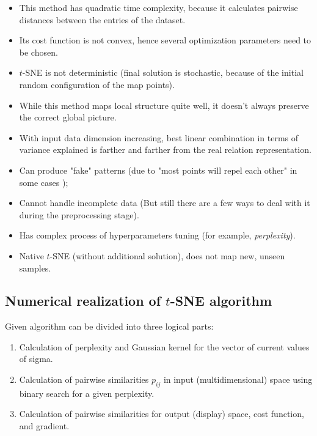 \documentclass[a4paper]{article}
\begin{document}
\begin{itemize}
	\item 
	This method has quadratic time complexity, because it calculates pairwise distances between the entries of the dataset.
	\item
	Its cost function is not convex, hence several optimization parameters need to be chosen.
	\item
	$t$-SNE is not deterministic (final solution is stochastic, because of the initial random configuration of the map points).
	\item 
	While this method maps local structure quite well, it doesn't always preserve the correct global picture.
	\item 
	With input data dimension increasing, best linear combination in terms of variance explained is farther and farther from the real relation representation.
	\item 
	Can produce "fake" patterns (due to "most points will repel each other" in some cases \cite{mathstack});
	\item 
	Cannot handle incomplete data (But still there are a few ways to deal with it during the preprocessing stage).
	\item
	Has complex process of hyperparameters tuning (for example, \textit{perplexity}).
	\item 
	Native $t$-SNE (without additional solution), does not map new, unseen samples.
	
\end{itemize}

\subsection*{Numerical realization of $t$-SNE algorithm}

Given algorithm can be divided into three logical parts:

\begin{enumerate}
	\item 
	Calculation of perplexity and Gaussian kernel for the vector of current values of sigma.
	\item  
	Calculation of pairwise similarities $p_{ij}$ in input (multidimensional) space using binary search for a given perplexity.
	\item  
	Calculation of pairwise similarities for output (display) space, cost function, and gradient.
	
\end{enumerate}
\end{document}
